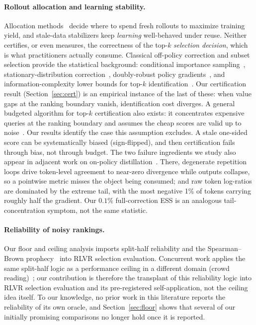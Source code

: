 \documentclass[11pt]{article}
\begin{document}
\paragraph{Rollout allocation and learning stability.}
Allocation methods~\citep{gradalign,learnalign} decide where to spend fresh
rollouts to maximize training yield, and stale-data stabilizers keep
\emph{learning} well-behaved under reuse. Neither certifies, or even
measures, the correctness of the top-$k$ \emph{selection decision}, which is
what practitioners actually consume. Classical off-policy correction and
subset selection provide the statistical background: conditional importance
sampling~\citep{rowland20}, stationary-distribution
correction~\citep{liu19}, doubly-robust policy gradients~\citep{huang20},
and information-complexity lower bounds for top-$k$
identification~\citep{kaufmann13}. Our certification result
(Section~\ref{sec:cert}) is an empirical instance of the last of these: when
value gaps at the ranking boundary vanish, identification cost diverges.
A general budgeted algorithm for top-$k$ certification also exists: it
concentrates expensive queries at the ranking boundary and assumes the cheap
scores are valid up to noise~\citep{ace}. Our results identify the case this
assumption excludes. A stale one-sided score can be systematically biased
(sign-flipped), and then certification fails through bias, not through
budget. The
two failure ingredients we study also appear in adjacent work on on-policy
distillation~\citep{tide}. There, degenerate repetition loops drive
token-level agreement to near-zero divergence while outputs collapse, so a
pointwise metric misses the object being consumed; and raw token log-ratios
are dominated by the extreme tail, with the most negative 1\% of tokens
carrying roughly half the gradient. Our $0.1\%$ full-correction ESS is an
analogous tail-concentration symptom, not the same statistic.

\paragraph{Reliability of noisy rankings.}
Our floor and ceiling analysis imports split-half reliability and the
Spearman--Brown prophecy~\citep{spearman1910,brown1910} into RLVR selection
evaluation. Concurrent work applies the same split-half logic as a
performance ceiling in a different domain (crowd
reading)~\citep{floorceiling}; our contribution is therefore the transplant
of this reliability logic into RLVR selection evaluation and its
pre-registered self-application, not the ceiling idea itself. To our knowledge, no prior work in this literature reports the
reliability of its own oracle, and Section~\ref{sec:floor} shows that
several of our initially promising comparisons no longer hold once it is
reported.
\end{document}
